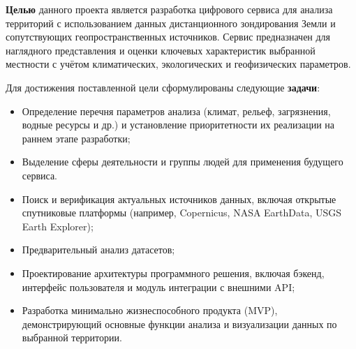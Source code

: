\textbf{Целью} данного проекта является разработка цифрового сервиса для анализа территорий с использованием данных дистанционного зондирования Земли и сопутствующих геопространственных источников. Сервис предназначен для наглядного представления и оценки ключевых характеристик выбранной местности с учётом климатических, экологических и геофизических параметров.

Для достижения поставленной цели сформулированы следующие \textbf{задачи}:

\begin{itemize}
	\item Определение перечня параметров анализа (климат, рельеф, загрязнения, водные ресурсы и др.) и установление приоритетности их реализации на раннем этапе разработки;
	\item Выделение сферы деятельности и группы людей для применения будущего сервиса.
	\item Поиск и верификация актуальных источников данных, включая открытые спутниковые платформы (например, Copernicus, NASA EarthData, USGS Earth Explorer);
	\item Предварительный анализ датасетов;
	\item Проектирование архитектуры программного решения, включая бэкенд, интерфейс пользователя и модуль интеграции с внешними API;
	\item Разработка минимально жизнеспособного продукта (MVP), демонстрирующий основные функции анализа и визуализации данных по выбранной территории.
\end{itemize}
